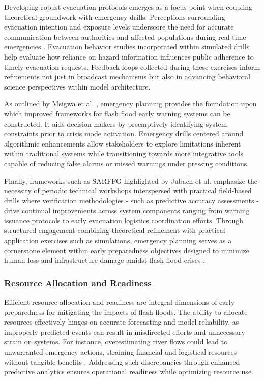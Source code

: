 Developing robust evacuation protocols emerges as a focus point when coupling theoretical groundwork with emergency drills. Perceptions surrounding evacuation intention and exposure levels underscore the need for accurate communication between authorities and affected populations during real-time emergencies \citep{Zhang2024}. Evacuation behavior studies incorporated within simulated drills help evaluate how reliance on hazard information influences public adherence to timely evacuation requests. Feedback loops collected during these exercises inform refinements not just in broadcast mechanisms but also in advancing behavioral science perspectives within model architecture.

As outlined by Msigwa et al. \citep{Msigwa2024}, emergency planning provides the foundation upon which improved frameworks for flash flood early warning systems can be constructed. It aids decision-makers by preemptively identifying system constraints prior to crisis mode activation. Emergency drills centered around algorithmic enhancements allow stakeholders to explore limitations inherent within traditional systems while transitioning towards more integrative tools capable of reducing false alarms or missed warnings under pressing conditions.

Finally, frameworks such as SARFFG highlighted by Jubach et al. \citep{Jubach2016} emphasize the necessity of periodic technical workshops interspersed with practical field-based drills where verification methodologies - such as predictive accuracy assessments - drive continual improvements across system components ranging from warning issuance protocols to early evacuation logistics coordination efforts. Through structured engagement combining theoretical refinement with practical application exercises such as simulations, emergency planning serves as a cornerstone element within early preparedness objectives designed to minimize human loss and infrastructure damage amidst flash flood crises \citep{Terti2015}\citep{Nguyen2020}\citep{Amponsah2016}.


\subsubsection{Resource Allocation and Readiness}
Efficient resource allocation and readiness are integral dimensions of early preparedness for mitigating the impacts of flash floods. The ability to allocate resources effectively hinges on accurate forecasting and model reliability, as improperly predicted events can result in misdirected efforts and unnecessary strain on systems. For instance, overestimating river flows could lead to unwarranted emergency actions, straining financial and logistical resources without tangible benefits \citep{Msigwa2024}. Addressing such discrepancies through enhanced predictive analytics ensures operational readiness while optimizing resource use.

